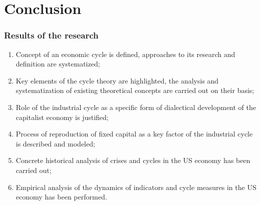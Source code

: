 \section{Conclusion}

\begin{frame}
  \frametitle{Results of the research}
  \begin{enumerate}
    \item Concept of an economic cycle is defined, approaches to its research and definition are systematized;
    \item Key elements of the cycle theory are highlighted, the analysis and systematization of existing theoretical concepts are carried out on their basis;
    \item Role of the industrial cycle as a specific form of dialectical development of the capitalist economy is justified;
    \item Process of reproduction of fixed capital as a key factor of the industrial cycle is described and modeled;
    \item Concrete historical analysis of crises and cycles in the US economy has been carried out;
    \item Empirical analysis of the dynamics of indicators and cycle measures in the US economy has been performed.
  \end{enumerate}
\end{frame}
